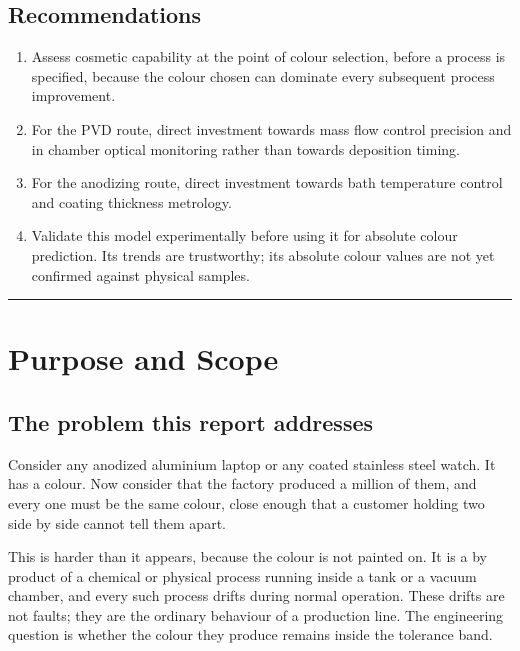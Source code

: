 \documentclass[11pt,a4paper]{article}
\begin{document}
\subsection*{Recommendations}

\begin{enumerate}[leftmargin=1.6em, itemsep=4pt]
\item Assess cosmetic capability at the point of colour selection, before a
process is specified, because the colour chosen can dominate every subsequent
process improvement.
\item For the PVD route, direct investment towards mass flow control precision
and in chamber optical monitoring rather than towards deposition timing.
\item For the anodizing route, direct investment towards bath temperature
control and coating thickness metrology.
\item Validate this model experimentally before using it for absolute colour
prediction. Its trends are trustworthy; its absolute colour values are not yet
confirmed against physical samples.
\end{enumerate}

\vspace{0.4cm}
\noindent\rule{\textwidth}{0.4pt}

\tableofcontents

\setcounter{page}{1}

\section{Purpose and Scope}

\subsection{The problem this report addresses}

Consider any anodized aluminium laptop or any coated stainless steel watch. It
has a colour. Now consider that the factory produced a million of them, and
every one must be the same colour, close enough that a customer holding two
side by side cannot tell them apart.

This is harder than it appears, because the colour is not painted on. It is a
by product of a chemical or physical process running inside a tank or a vacuum
chamber, and every such process drifts during normal operation. These drifts
are not faults; they are the ordinary behaviour of a production line. The
engineering question is whether the colour they produce remains inside the
tolerance band.
\end{document}

